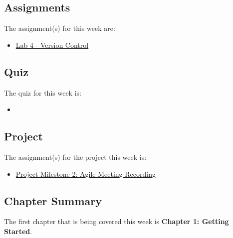 \subsection{Assignments}

The assignment(s) for this week are:

\begin{itemize}
    \item \href{https://github.com/cu-cspb-3308-software-dev-summer-2024/lab-4-QuantumCompiler}{Lab 4 - Version Control}
\end{itemize}

\subsection{Quiz}

The quiz for this week is:

\begin{itemize}
    \item {}
\end{itemize}

\subsection{Project}

The assignment(s) for the project this week is:

\begin{itemize}
    \item \href{https://applied.cs.colorado.edu/mod/assign/view.php?id=61318}{Project Milestone 2: Agile Meeting Recording}
\end{itemize}

\subsection{Chapter Summary}

The first chapter that is being covered this week is \textbf{Chapter 1: Getting Started}.

